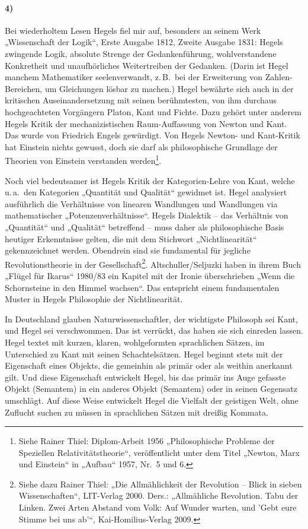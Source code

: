 \documentclass[12pt,a4paper]{article}
\begin{document}
\paragraph{4)} 
Bei wiederholtem Lesen Hegels fiel mir auf, besonders an seinem Werk
„Wissenschaft der Logik“, Erste Ausgabe 1812, Zweite Ausgabe 1831: Hegels
zwingende Logik, absolute Strenge der Gedankenführung, wohlverstandene
Konkretheit und unaufhörliches Weitertreiben der Gedanken. (Darin ist Hegel
manchem Mathematiker seelenverwandt, z.\,B.\ bei der Erweiterung von
Zahlen-Bereichen, um Gleichungen lösbar zu machen.) Hegel bewährte sich auch in
der kritischen Auseinandersetzung mit seinen berühmtesten, von ihm durchaus
hochgeachteten Vorgängern Platon, Kant und Fichte. Dazu gehört unter anderem
Hegels Kritik der mechanizistischen Raum-Auffassung von Newton und Kant. Das
wurde von Friedrich Engels gewürdigt. Von Hegels Newton- und Kant-Kritik hat
Einstein nichts gewusst, doch sie darf als philosophische Grundlage der
Theorien von Einstein verstanden werden\footnote{Siehe Rainer Thiel:
  Diplom-Arbeit 1956 „Philosophische Probleme der Speziellen
  Relativitätstheorie“, veröffentlicht unter dem Titel „Newton, Marx und
  Einstein“ in „Aufbau“ 1957, Nr.~5 und 6.}.
\enlargethispage{2em}


Noch viel bedeutsamer ist Hegels Kritik der Kategorien-Lehre von Kant, welche
u.\,a.\ den Kategorien „Quantität und Qualität“ gewidmet ist. Hegel analysiert
ausführlich die Verhältnisse von linearen Wandlungen und Wandlungen via
mathematischer „Potenzenverhältnisse“. Hegels Dialektik – das Verhältnis von
„Quantität“ und „Qualität“ betreffend – muss daher als philosophische Basis
heutiger Erkenntnisse gelten, die mit dem Stichwort „Nichtlinearität“
gekennzeichnet werden. Obendrein sind sie fundamental für jegliche
Revolutionstheorie in der Gesellschaft\footnote{Siehe dazu Rainer Thiel: „Die
  Allmählichkeit der Revolution – Blick in sieben Wissenschaften“, LIT-Verlag
  2000.  Ders.: „Allmähliche Revolution. Tabu der Linken. Zwei Arten Abstand
  vom Volk: Auf Wunder warten, und 'Gebt eure Stimme bei uns ab'“,
  Kai-Homilius-Verlag 2009.}.  Altschuller/Seljuzki haben in ihrem Buch „Flügel
für Ikarus“ 1980/83 ein Kapitel mit der Ironie überschrieben „Wenn die
Schornsteine in den Himmel wachsen“. Das entspricht einem fundamentalen Muster
in Hegels Philosophie der Nichtlinearität.

In Deutschland glauben Naturwissenschaftler, der wichtigste Philosoph sei Kant,
und Hegel sei verschwommen. Das ist verrückt, das haben sie sich einreden
lassen.  Hegel textet mit kurzen, klaren, wohlgeformten sprachlichen Sätzen, im
Unterschied zu Kant mit seinen Schachtelsätzen. Hegel beginnt stets mit der
Eigenschaft eines Objekts, die gemeinhin als primär oder als weithin anerkannt
gilt. Und diese Eigenschaft entwickelt Hegel, bis das primär ins Auge gefasste
Objekt (Semantem) in ein anderes Objekt (Semantem) oder in seinen Gegensatz
umschlägt. Auf diese Weise entwickelt Hegel die Vielfalt der geistigen Welt,
ohne Zuflucht suchen zu müssen in sprachlichen Sätzen mit dreißig Kommata.
\end{document}
